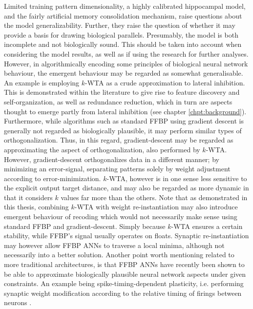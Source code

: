 

Limited training pattern dimensionality, a highly calibrated hippocampal model, and the fairly artificial memory consolidation mechanism, raise questions about the model generalizability. Further, they raise the question of whether it may provide a basis for drawing biological parallels.
Presumably, the model is both incomplete and not biologically sound. This should be taken into account when considering the model results, as well as if using the research for further analyses. However, in algorithmically encoding some principles of biological neural network behaviour, the emergent behaviour may be regarded as somewhat generalisable.
An example is employing $k$-WTA as a crude approximation to lateral inhibition. This is demonstrated within the literature to give rise to feature discovery and self-organization, as well as redundance reduction, which in turn are aspects thought to emerge partly from lateral inhibition (see chapter \ref{chpt:background}).
Furthermore, while algorithms such as standard FFBP using gradient descent is generally not regarded as biologically plausible, it may perform similar types of orthogonalization. Thus, in this regard, gradient-descent may be regarded as approximating the aspect of orthogonalization, also performed by $k$-WTA. However, gradient-descent orthogonalizes data in a different manner; by minimizing an error-signal, separating patterns solely by weight adjustment according to error-minimization. $k$-WTA, however is in one sense less sensitive to the explicit output target distance, and may also be regarded as more dynamic in that it considers $k$ values far more than the others. Note that as demonstrated in this thesis, combining $k$-WTA with weight re-instantiation may also introduce emergent behaviour of recoding which would not necessarily make sense using standard FFBP and gradient-descent. Simply because $k$-WTA ensures a certain stability, while FFBP's signal usually operates on floats. Synaptic re-instantiation may however allow FFBP ANNs to traverse a local minima, although not necessarily into a better solution.
Another point worth mentioning related to more traditional architectures, is that FFBP ANNs have recently been shown to be able to approximate biologically plausible neural network aspects under given constraints. An example being spike-timing-dependent plasticity, i.e. performing synaptic weight modification according to the relative timing of firings between neurons \citep{Bengio2015}.


